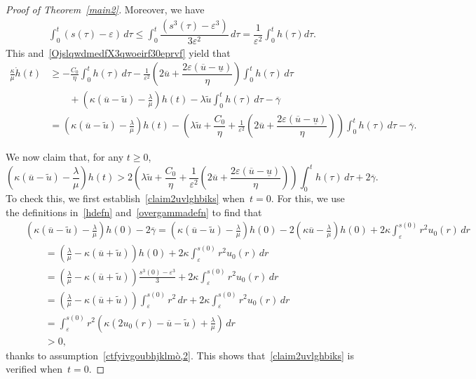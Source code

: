 \documentclass[12pt,a4paper,intlimits,sumlimits]{amsart}
\theoremstyle{definition}
\theoremstyle{plain}
\numberwithin{equation}{section}
\renewcommand{\le}{\leqslant}
\renewcommand{\ge}{\geqslant}
\begin{document}
\begin{proof}[Proof of Theorem~\ref{main2}]
Moreover,  we have
\[
\begin{split}
\int_0^t (s(\tau)-\varepsilon) \,d\tau\le\int_0^t \dfrac{(s^3(\tau)-\varepsilon^3)}{3\varepsilon^2} \,d\tau = \dfrac{1}{\varepsilon^2}\int_0^t h(\tau) d\tau.
\end{split}
\]
This and~\eqref{OjslqwdmedfX3qwoeirf30eprvf} yield that
\begin{equation}\label{vycgiuobhIJNPCKL}
\begin{split}
\frac{\kappa}{\mu}\dot h(t)&\ge -\frac{C_0}{\eta}\int_0^t h(\tau) \,d\tau -\frac{1}{\varepsilon^2}\left(2\overline u +\dfrac{2\varepsilon(\overline u -\underline u)}{\eta} \right) \int_0^t h(\tau) \,d\tau\\
&\qquad+\left(\kappa(\overline{u}-\widetilde u)-\frac{\lambda}{\mu}\right)h(t)-\lambda\widetilde u \int_0^t h(\tau)\,d\tau-\overline\gamma\\&=
\left(\kappa(\overline{u}-\widetilde u)-\frac{\lambda}{\mu}\right)h(t) -\left(\lambda\widetilde u +\dfrac{C_0}{\eta}+\frac{1}{\varepsilon^2}\left(2\overline u +\dfrac{2\varepsilon(\overline u -\underline u)}{\eta} \right)\right)\int_0^t h(\tau)\,d\tau -\overline\gamma.
\end{split}
\end{equation}

We now claim that, for any $ t\ge 0$,
\begin{equation}\label{claim2uvlghbiks}
\left(\kappa(\overline{u}-\widetilde u)-\frac{\lambda}{\mu}\right)h(t)>2\left(\lambda\widetilde u +\dfrac{C_0}{\eta}+\frac{1}{\varepsilon^2}\left(2\overline u +\dfrac{2\varepsilon(\overline u -\underline u)}{\eta} \right)\right)\int_0^t h(\tau)\,d\tau +2\overline\gamma .
\end{equation}
To check this, we first establish~\eqref{claim2uvlghbiks} when~$t=0$.
For this, we use the definitions in~\eqref{hdefn} and~\eqref{overgammadefn} to find that
\begin{eqnarray*}
&&\left(\kappa(\overline{u}-\widetilde u)-\frac{\lambda}{\mu}\right)h(0)-2\overline\gamma =\left(\kappa(\overline{u}-\widetilde u)-\frac{\lambda}{\mu}\right)h(0)-2\left(\kappa \overline{u}-\frac{\lambda}{\mu}\right)h(0)+2\kappa\int_\varepsilon^{s(0)}r^2u_0(r)\,dr\\
&&\qquad=\left(\frac{\lambda}{\mu}-\kappa(\overline{u}+\widetilde u)
\right)h(0)+2\kappa\int_\varepsilon^{s(0)}r^2u_0(r)\,dr\\&&\qquad=\left(\frac{\lambda}{\mu}-
\kappa(\overline{u}+\widetilde u)
\right)\frac{s^3(0)-\varepsilon^3}3+2\kappa\int_\varepsilon^{s(0)}r^2u_0(r)\,dr\\&&\qquad=\left(\frac{\lambda}{\mu}-
\kappa(\overline{u}+\widetilde u)
\right)\int_\varepsilon^{s(0)}r^2\,dr+2\kappa\int_\varepsilon^{s(0)}r^2u_0(r)\,dr\\&&\qquad=\int_\varepsilon^{s(0)}r^2
\left( \kappa(2 u_0(r)-\overline{u} -\widetilde u)+\frac\lambda\mu\right)
\,dr\\
&&\qquad>0,
\end{eqnarray*}
thanks to assumption~\eqref{ctfyivgoubhjklmò,2}.
This shows that~\eqref{claim2uvlghbiks} is verified when~$t=0$. 


\end{proof}
\end{document}
